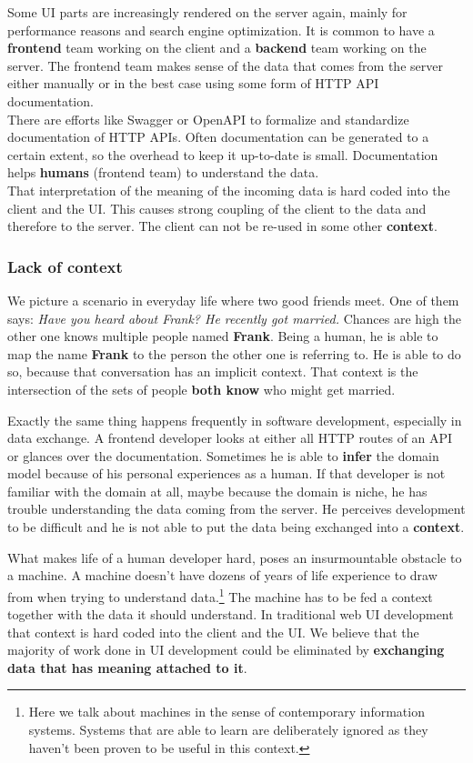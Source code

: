 Some UI parts are increasingly rendered on the server again, mainly for performance reasons and search engine optimization. It is common to have a \textbf{frontend} team working on the client and a \textbf{backend} team working on the server. The frontend team makes sense of the data that comes from the server either manually or in the best case using some form of HTTP API documentation.
\\ There are efforts like Swagger or OpenAPI to formalize and standardize documentation of HTTP APIs. Often documentation can be generated to a certain extent, so the overhead to keep it up-to-date is small. Documentation helps \textbf{humans} (frontend team) to understand the data.
\\ That interpretation of the meaning of the incoming data is hard coded into the client and the UI. This causes strong coupling of the client to the data and therefore to the server. The client can not be re-used in some other \textbf{context}.

\subsubsection{Lack of context}\label{datahumanmachine}

We picture a scenario in everyday life where two good friends meet. One of them says: \textit{Have you heard about Frank? He recently got married.} Chances are high the other one knows multiple people named \textbf{Frank}. Being a human, he is able to map the name \textbf{Frank} to the person the other one is referring to. He is able to do so, because that conversation has an implicit context. That context is the intersection of the sets of people \textbf{both know} who might get married.
\par Exactly the same thing happens frequently in software development, especially in data exchange. A frontend developer looks at either all HTTP routes of an API or glances over the documentation. Sometimes he is able to \textbf{infer} the domain model because of his personal experiences as a human. If that developer is not familiar with the domain at all, maybe because the domain is niche, he has trouble understanding the data coming from the server. He perceives development to be difficult and he is not able to put the data being exchanged into a \textbf{context}.
\par What makes life of a human developer hard, poses an insurmountable obstacle to a machine. A machine doesn't have dozens of years of life experience to draw from when trying to understand data.\footnote{Here we talk about machines in the sense of contemporary information systems. Systems that are able to learn are deliberately ignored as they haven't been proven to be useful in this context.} The machine has to be fed a context together with the data it should understand. In traditional web UI development that context is hard coded into the client and the UI. We believe that the majority of work done in UI development could be eliminated by \textbf{exchanging data that has meaning attached to it}.

